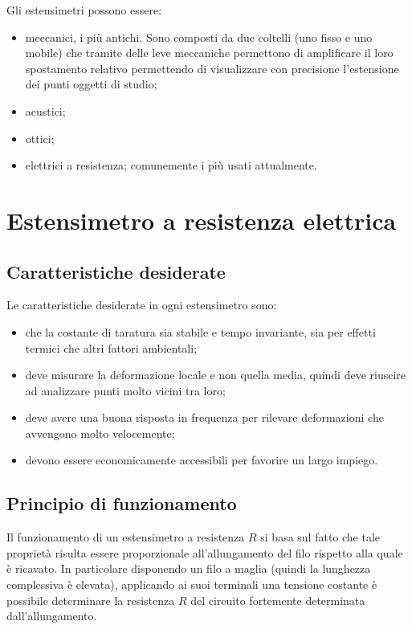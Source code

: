 	Gli estensimetri possono essere:
	\begin{itemize}
		\item meccanici, i più antichi. Sono composti da due coltelli (uno fisso e uno mobile) che tramite delle leve meccaniche permettono di amplificare il loro spostamento relativo permettendo di visualizzare con precisione l'estensione dei punti oggetti di studio;
		
		\item acustici;
		\item ottici;
		\item elettrici a resistenza; comunemente i più usati attualmente.
	\end{itemize}

\section{Estensimetro a resistenza elettrica}
	\subsection*{Caratteristiche desiderate}
		Le caratteristiche desiderate in ogni estensimetro sono:
		\begin{itemize}
			\item che la costante di taratura sia stabile e tempo invariante, sia per effetti termici che altri fattori ambientali;
			\item deve misurare la deformazione locale e non quella media, quindi deve riuscire ad analizzare punti molto vicini tra loro;
			\item deve avere  una buona risposta in frequenza per rilevare deformazioni che avvengono molto velocemente;
			\item devono essere economicamente accessibili per favorire un largo impiego.
		\end{itemize}
	
	\subsection{Principio di funzionamento}
		Il funzionamento di un estensimetro a resistenza $R$ si basa sul fatto che tale proprietà risulta essere proporzionale all'allungamento del filo rispetto alla quale è ricavato. In particolare disponendo un filo a maglia (quindi la lunghezza complessiva è elevata), applicando ai suoi terminali una tensione costante è possibile determinare la resistenza $R$ del circuito fortemente determinata dall'allungamento.
		

